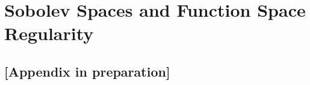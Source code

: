 \appendix
\chapter{Sobolev Spaces and Function Space Regularity}
\label{app:sobolev}
\section*{[Appendix in preparation]}
